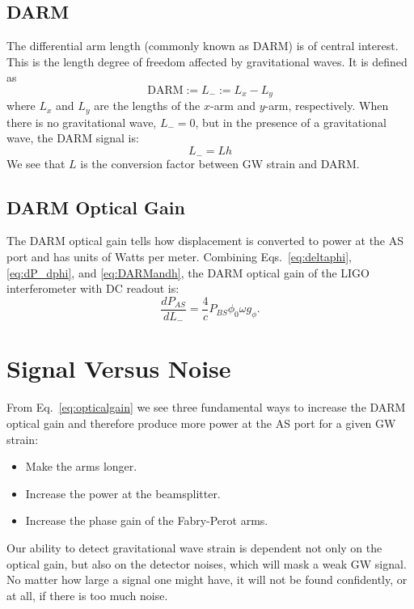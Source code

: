 \subsection{DARM}
The differential arm length (commonly known as DARM) is of central interest. This
is the length degree of freedom affected by gravitational waves. It is
defined as
\begin{equation}
\mathrm{DARM} := L_- := L_x - L_y
\end{equation}
where $L_x$ and $L_y$ are the lengths of the $x$-arm and $y$-arm,
respectively. When there is no gravitational wave, $L_-=0$, but in the
presence of a gravitational wave, the DARM signal is:
\begin{equation}
L_- = Lh
\label{eq:DARMandh}
\end{equation}
We see that $L$ is the conversion factor between GW strain and DARM.



\subsection{DARM Optical Gain}
The DARM optical gain tells how displacement is converted to power at
the AS port and has units of Watts per meter. Combining
Eqs.~\ref{eq:deltaphi}, \ref{eq:dP_dphi}, and \ref{eq:DARMandh}, the
DARM optical gain of the LIGO interferometer with DC readout is:
\begin{equation}
\frac{d P_{AS}}{dL_-} = \frac{4}{c} P_{BS} \phi_0 \omega g_{\phi}.
\label{eq:opticalgain}
\end{equation}




\section{Signal Versus Noise} 
From Eq.~\ref{eq:opticalgain} we see three fundamental
ways to increase the DARM optical gain and therefore produce more
power at the AS port for a given GW strain:
\begin{itemize}
\item Make the arms longer. \vspace{-10 pt}
\item Increase the power at the beamsplitter. \vspace{-10 pt}
\item Increase the phase gain of the Fabry-Perot arms.
\end{itemize}
Our ability to detect gravitational wave strain is dependent not only
on the optical gain, but also on the detector noises, which will mask
a weak GW signal. No matter how large a signal one might have, it will
not be found confidently, or at all, if there is too much noise.


